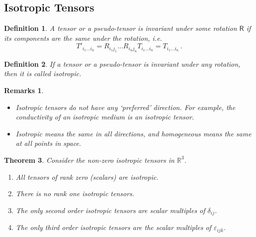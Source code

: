 \documentclass{article}
\theoremstyle{plain}\theoremheaderfont{\normalfont\itshape}\theorembodyfont{\rmfamily}\theoremseparator{.}\newtheorem*{rem}{Remark}\newtheorem*{ex}{Example}\newtheorem*{proof}{Proof}\newtheorem*{altp}{Alternative proof}
\theoremstyle{plain}\theoremheaderfont{\normalfont\bfseries}\theorembodyfont{\rmfamily}\theoremseparator{.}\newtheorem{thm}{Theorem}[section]\newtheorem{lem}[thm]{Lemma}\newtheorem{prop}[thm]{Proposition}\newtheorem*{cor}{Corollary}\newtheorem{defn}[thm]{Definition}\newtheorem{clm}[thm]{Claim}\newtheorem{clminproof}{Claim}
\theoremstyle{break}\theoremheaderfont{\normalfont\itshape}\theorembodyfont{\rmfamily}\theoremseparator{.\medskip}\newtheorem*{proofskip}{Proof}\newtheorem*{exs}{Examples}\newtheorem*{rems}{Remarks}
\theoremstyle{break}\theoremheaderfont{\normalfont\bfseries}\theorembodyfont{\rmfamily}\theoremseparator{.\medskip}\newtheorem{lemskip}[thm]{Lemma}\newtheorem{defnskip}[thm]{Definition}\newtheorem{propskip}[thm]{Proposition}\newtheorem{thmskip}[thm]{Theorem}
\numberwithin{equation}{section}
\begin{document}
	\subsection{Isotropic Tensors}
	\begin{defn}
		A tensor or a pseudo-tensor is \textit{invariant} under some rotation \(\mathsf{R}\) if its components are the same under the rotation, i.e.
		\[T'_{i_1\dots i_n}=R_{i_1j_1}\dots R_{i_nj_n}T_{i_1\dots i_n}=T_{i_1\dots i_n}\,.\]
	\end{defn}
	\begin{defn}
		If a tensor or a pseudo-tensor is invariant under any rotation, then it is called \textit{isotropic}.
	\end{defn}
	\begin{rems}
		\begin{itemize}[topsep=0pt]
			\item Isotropic tensors do not have any `preferred' direction. For example, the conductivity of an isotropic medium is an isotropic tensor.
			\item \textit{Isotropic} means the same in all directions, and \textit{homogeneous} means the same at all points in space.
		\end{itemize}
	\end{rems}
	\begin{thm}
		Consider the non-zero isotropic tensors in \(\mathbb{R}^3\).
		\begin{enumerate}[topsep=0pt]
			\item[(i)] All tensors of rank zero (scalars) are isotropic.
			\item[(ii)] There is no rank one isotropic tensors.
			\item[(iii)] The only second order isotropic tensors are scalar multiples of \(\delta_{ij}\).
			\item[(iv)] The only third order isotropic tensors are the scalar multiples of \(\varepsilon_{ijk}\). 
		\end{enumerate}
	\end{thm}
\end{document}
